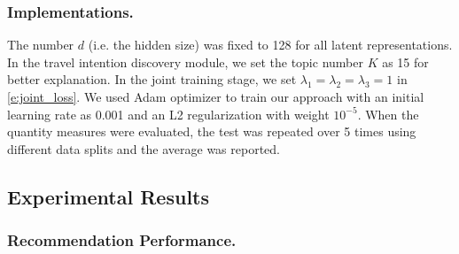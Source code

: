 \documentclass[letterpaper]{article} %
\begin{document}
\subsubsection{Implementations.}
The number $d$ (i.e. the hidden size) was fixed to 128 for all latent representations. 
In the travel intention discovery module, we set the topic number $K$ as 15 for better explanation. 
In the joint training stage, we set $\lambda_1=\lambda_2=\lambda_3=1$ in \cref{e:joint_loss}. 
We used Adam optimizer to train our approach with an initial learning rate as 0.001 and an L2 regularization with weight $10^{-5}$.
When the quantity measures were evaluated, the test was repeated over 5 times using different data splits and the average was reported.


\subsection{Experimental Results}

\subsubsection{Recommendation Performance.}
\end{document}
